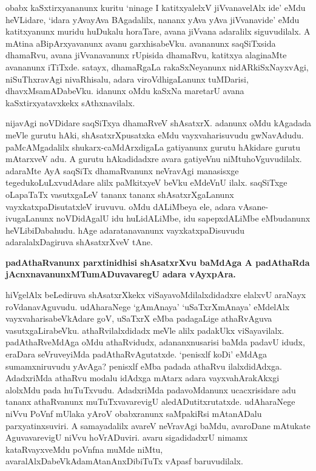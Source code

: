 \noindent
obabx kaSxtirxyananunx kuritu `ninage I katitxyalelxV jiVvanavelAlx ide' eMdu heVLidare, `idara yAva\-yAva BAgadalilx, nananx yAva yAva jiVvanavide' eMdu katitxyanunx muridu huDukalu horaTare, avana jiVvana adaralilx siguvudilalx. A mAtina aBipArxyavanunx avanu garxhisabeVku. avananunx saqSiTxsida dhamaRvu, avana jiVvanavanunx rUpisida dhamaRvu, katitxya alaginaMte avananunx iTiTxde. satayx, dhamaRgaLa rakaSxNeyanunx nidARkiSxNayxvAgi, niSuThxravAgi nivaRhisalu, adara viroVdhigaLanunx tuMDarisi, dhavxMsamADa\-beVku. idanunx oMdu kaSxNa maretarU avana kaSxtirxyatavxkekx sAthxnavilalx. 

nijavAgi noVDidare saqSiTxya dhamaRveV shAsatxrX. adanunx oMdu kAgadada meVle gurutu hAki, shAsatxrXpusatxka eMdu vayxvaharisuvudu gwNa\-vAdudu. paMcAMgadalilx shukarx-caMdArxdigaLa gatiyanunx gurutu hAkidare gurutu mAtarxveV adu. A gurutu hAkadidadxre avara gatiyeVnu niMtuhoVguvudilalx. adaraMte AyA saqSiTx dhamaRvanunx neVra\-vAgi manasisxge tegedukoLuLxvudAdare alilx paMkitxyeV beVku eMdeVnU ilalx. saqSiTxge oLapaTaTx vasutxgaLeV tananx tananx shAsatxrXgaLanunx vayxkatxpaDisutatxleV iruvuvu. oMdu dALiMbeya ele, adara vAsane-ivugaLanunx noVDi\-dAgalU idu huLidALiMbe, idu sapepxdALiMbe eMbudanunx heVLibiDabahudu. hAge adaratana\-vanunx vayxkatxpaDisuvudu adaralalxDagiruva shAsatxrXveV tAne.

{\medskip
\noindent
{\large\bf padAthaRvanunx parxtinidhisi shAsatxrXvu baMdAga A padAthaRda jAcnxnavanunxMTu\-mADuvavaregU adara vAyxpAra.}}\label{page198}                               
\smallskip

\noindent
hiVgelAlx beLediruva shAsatxrXkekx viSayavoMdilalxdidadxre elalxvU araNayx roVdana\-vAgu\-vudu. udAhara\-Nege `gAmAnaya' `uSaTxrXmAnaya' eMdelAlx vayxvaharisabeVkAdare goV, uSaTxrX eMba padagaLige athaR\-vAguva vasutxgaLirabeVku. athaRvilalxdidadx meVle alilx padakUkx viSayavilalx. padAthaRveMdAga oMdu athaRvidudx, adananxnusarisi baMda padavU idudx, eraDara seVruveyiMda padAthaRvAgutatxde. `penisxlf koDi' eMdAga sumamxniruvudu yAvAga? penisxlf eMba padada athaRvu ilalxdidAdxga. AdadxriMda athaRvu modalu idAdxga mAtarx adara vayxvahArakAkxgi alolxMdu pada huTuTxvudu. AdadxriMda pada\-voMdanunx ucacxrisidare adu tananx athaRvanunx muTuTx\-vavarevigU aledADutitxrutatxde. udAharaNege niVvu PoVnf mUlaka yAroV obabxranunx saMpakiRsi mAtanADalu parxyatinxsuviri. A samayadalilx avareV neVra\-vAgi baMdu, avaroDane mAtukate AguvavarevigU niVvu hoVrADuviri. avaru siga\-didadxrU nimamx kataRvayxveMdu poVnfna muMde niMtu, avaralAlxDabeVkAda\break mAta\-nAnxDibiTuTx vApasf baruvudilalx.

